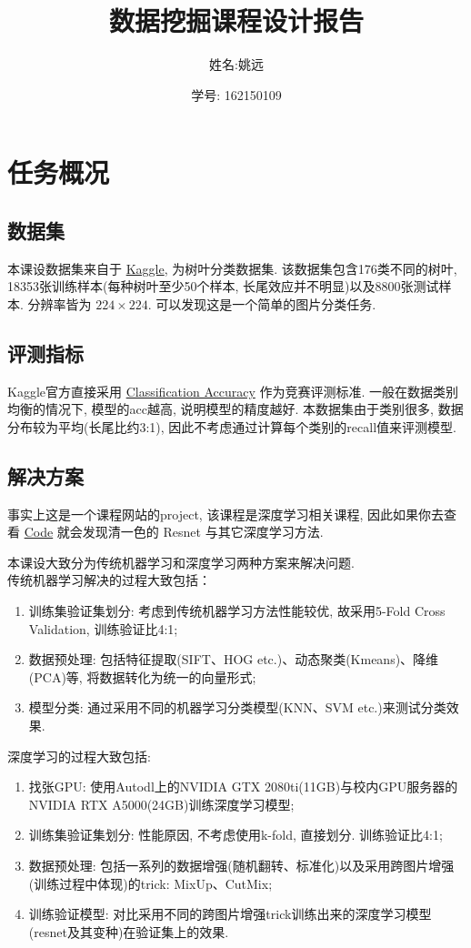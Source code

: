 \documentclass[lang=cn,12pt,a4paper,cite=authoryear]{elegantpaper}
\title{数据挖掘课程设计报告}
\author{姓名:姚远\and 学号: 162150109}
\date{\zhtoday}
\begin{document}
\maketitle

\section{任务概况}
\subsection{数据集}
本课设数据集来自于 \href{https://www.kaggle.com/competitions/classify-leaves}{Kaggle}, 为树叶分类数据集. 该数据集包含176类不同的树叶, 18353张训练样本(每种树叶至少50个样本, 长尾效应并不明显)以及8800张测试样本. 分辨率皆为 $224 \times 224$. 可以发现这是一个简单的图片分类任务.
\subsection{评测指标}
Kaggle官方直接采用 \href{https://www.kaggle.com/vipulgandhi/how-to-choose-right-metric-for-evaluating-ml-model}{Classification Accuracy} 作为竞赛评测标准. 一般在数据类别均衡的情况下, 模型的acc越高, 说明模型的精度越好. 本数据集由于类别很多, 数据分布较为平均(长尾比约3:1), 因此不考虑通过计算每个类别的recall值来评测模型.
\subsection{解决方案}
事实上这是一个课程网站的project, 该课程是深度学习相关课程, 因此如果你去查看 \href{https://www.kaggle.com/competitions/classify-leaves/code}{Code} 就会发现清一色的 Resnet 与其它深度学习方法.

本课设大致分为传统机器学习和深度学习两种方案来解决问题. \\传统机器学习解决的过程大致包括：
\begin{enumerate}
    \item 训练集验证集划分: 考虑到传统机器学习方法性能较优, 故采用5-Fold Cross Validation, 训练验证比4:1;
    \item 数据预处理: 包括特征提取(SIFT、HOG etc.)、动态聚类(Kmeans)、降维(PCA)等, 将数据转化为统一的向量形式;
    \item 模型分类: 通过采用不同的机器学习分类模型(KNN、SVM etc.)来测试分类效果.
\end{enumerate}
深度学习的过程大致包括:
\begin{enumerate}
    \item 找张GPU: 使用Autodl上的NVIDIA GTX 2080ti(11GB)与校内GPU服务器的NVIDIA RTX A5000(24GB)训练深度学习模型;
    \item 训练集验证集划分: 性能原因, 不考虑使用k-fold, 直接划分. 训练验证比4:1;
    \item 数据预处理: 包括一系列的数据增强(随机翻转、标准化)以及采用跨图片增强(训练过程中体现)的trick: MixUp、CutMix;
    \item 训练验证模型: 对比采用不同的跨图片增强trick训练出来的深度学习模型(resnet及其变种)在验证集上的效果.
\end{enumerate}
\end{document}
